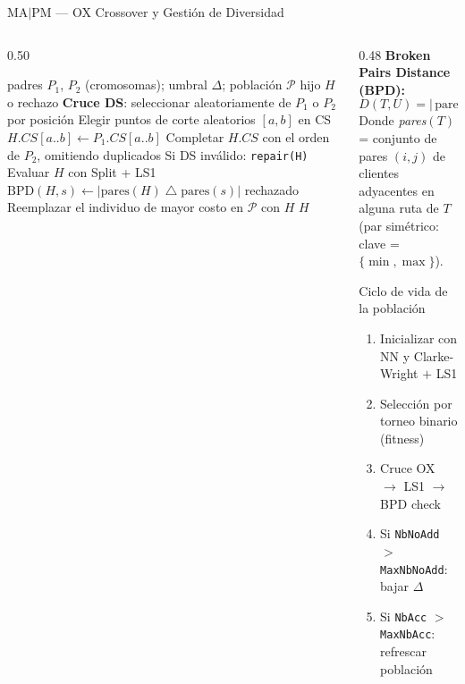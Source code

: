 \documentclass[aspectratio=169,10pt]{beamer}
\begin{document}
\begin{frame}{MA$|$PM --- OX Crossover y Gestión de Diversidad}
  \begin{columns}[T,onlytextwidth]
    \begin{column}{0.50\textwidth}
      \begin{algorithm}[H]
        \caption{\small OX Crossover + BPD}
        \begin{algorithmic}[1]\tiny
          \Require padres $P_1$, $P_2$ (cromosomas); umbral $\Delta$; población $\mathcal{P}$
          \Ensure  hijo $H$ o rechazo
          \State \textbf{Cruce DS}: seleccionar aleatoriamente de $P_1$ o $P_2$ por posición
          \State Elegir puntos de corte aleatorios $[a, b]$ en CS
          \State $H.CS[a..b] \gets P_1.CS[a..b]$
          \State Completar $H.CS$ con el orden de $P_2$, omitiendo duplicados
          \State Si DS inválido: \texttt{repair(H)}
          \State Evaluar $H$ con Split + LS1
            \State $\text{BPD}(H, s) \gets |\text{pares}(H) \mathbin{\triangle} \text{pares}(s)|$
              \State \Return rechazado 
            \EndIf
          \EndFor
          \State Reemplazar el individuo de mayor costo en $\mathcal{P}$ con $H$
          \State \Return $H$
        \end{algorithmic}
      \end{algorithm}
    \end{column}
    \begin{column}{0.48\textwidth}
      \textbf{Broken Pairs Distance (BPD):}
      \[
        D(T,U) = |\,\text{pares}(T) \mathbin{\triangle} \text{pares}(U)\,|
      \]
      \footnotesize
      Donde \textit{pares}$(T)$ = conjunto de pares $(i,j)$ de clientes adyacentes en alguna ruta de $T$ (par simétrico: clave = $\{\min,\max\}$).
      \vspace{0.4em}
      \begin{block}{Ciclo de vida de la población}\footnotesize
        \begin{enumerate}
          \item Inicializar con NN y Clarke-Wright $+$ LS1
          \item Selección por torneo binario (fitness)
          \item Cruce OX $\to$ LS1 $\to$ BPD check
          \item Si \texttt{NbNoAdd} $>$ \texttt{MaxNbNoAdd}: bajar $\Delta$
          \item Si \texttt{NbAcc} $>$ \texttt{MaxNbAcc}: refrescar población
        \end{enumerate}
      \end{block}
    \end{column}
  \end{columns}
\end{frame}
\end{document}
